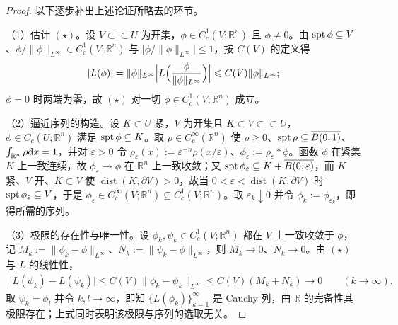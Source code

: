 \documentclass[../../main.tex]{subfiles}%
\begin{document}
\begin{proof}
以下逐步补出上述论证所略去的环节。

（1）估计 $(\star)$。设 $V\subset\subset U$ 为开集，$\phi\in C_c^1(V;\mathbb{R}^n)$ 且 $\phi\neq0$。由 $\operatorname{spt}\phi\subseteq V$、$\phi/\lVert\phi\rVert_{L^{\infty}}\in C_c^1(V;\mathbb{R}^n)$ 与 $\lvert\phi/\lVert\phi\rVert_{L^{\infty}}\rvert\leqslant1$，按 $C(V)$ 的定义得
\begin{align*}
\lvert L(\phi)\rvert=\lVert\phi\rVert_{L^{\infty}}\Bigl\lvert L\Bigl(\frac{\phi}{\lVert\phi\rVert_{L^{\infty}}}\Bigr)\Bigr\rvert\leqslant C(V)\lVert\phi\rVert_{L^{\infty}};
\end{align*}
$\phi=0$ 时两端为零，故 $(\star)$ 对一切 $\phi\in C_c^1(V;\mathbb{R}^n)$ 成立。

（2）逼近序列的构造。设 $K\subset U$ 紧，$V$ 为开集且 $K\subset V\subset\subset U$，$\phi\in C_c(U;\mathbb{R}^n)$ 满足 $\operatorname{spt}\phi\subseteq K$。取 $\rho\in C_c^{\infty}(\mathbb{R}^n)$ 使 $\rho\geqslant0$、$\operatorname{spt}\rho\subseteq\overline{B(0,1)}$、$\int_{\mathbb{R}^n}\rho\mathrm{d} x=1$，并对 $\varepsilon>0$ 令 $\rho_\varepsilon(x):=\varepsilon^{-n}\rho(x/\varepsilon)$、$\phi_\varepsilon:=\rho_\varepsilon*\phi$。函数 $\phi$ 在紧集 $K$ 上一致连续，故 $\phi_\varepsilon\to\phi$ 在 $\mathbb{R}^n$ 上一致收敛；又 $\operatorname{spt}\phi_\varepsilon\subseteq K+\overline{B(0,\varepsilon)}$，而 $K$ 紧、$V$ 开、$K\subset V$ 使 $\operatorname{dist}(K,\partial V)>0$，故当 $0<\varepsilon<\operatorname{dist}(K,\partial V)$ 时 $\operatorname{spt}\phi_\varepsilon\subseteq V$，于是 $\phi_\varepsilon\in C_c^{\infty}(V;\mathbb{R}^n)\subseteq C_c^1(V;\mathbb{R}^n)$。取 $\varepsilon_k\downarrow0$ 并令 $\phi_k:=\phi_{\varepsilon_k}$，即得所需的序列。

（3）极限的存在性与唯一性。设 $\phi_k,\psi_k\in C_c^1(V;\mathbb{R}^n)$ 都在 $V$ 上一致收敛于 $\phi$，记 $M_k:=\lVert\phi_k-\phi\rVert_{L^{\infty}}$、$N_k:=\lVert\psi_k-\phi\rVert_{L^{\infty}}$，则 $M_k\to0$、$N_k\to0$。由 $(\star)$ 与 $L$ 的线性性，
\begin{align*}
\lvert L(\phi_k)-L(\psi_k)\rvert\leqslant C(V)\lVert\phi_k-\psi_k\rVert_{L^{\infty}}\leqslant C(V)(M_k+N_k)\to0\qquad(k\to\infty).
\end{align*}
取 $\psi_k=\phi_l$ 并令 $k,l\to\infty$，即知 $\{L(\phi_k)\}_{k=1}^{\infty}$ 是 Cauchy 列，由 $\mathbb{R}$ 的完备性其极限存在；上式同时表明该极限与序列的选取无关。


\end{proof}
\end{document}
